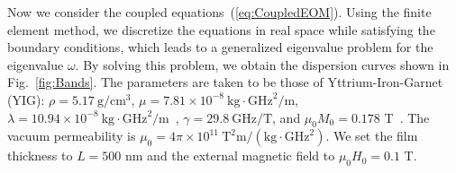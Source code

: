 \documentclass[10pt]{iopart}
\begin{document}
Now we consider the coupled equations~(\ref{eq:CoupledEOM}). Using the finite element method, we discretize the equations in real space while satisfying the boundary conditions, which leads to a generalized eigenvalue problem for the eigenvalue $\omega$. By solving this problem, we obtain the dispersion curves shown in Fig.~\ref{fig:Bands}. The parameters are taken to be those of Yttrium-Iron-Garnet (YIG): $\rho=5.17\ \mathrm{g}/\mathrm{cm}^3$, $\mu=7.81\times10^{-8}\ \mathrm{kg}\cdot\mathrm{GHz}^2/\mathrm{m}$, $\lambda=10.94\times10^{-8}\ \mathrm{kg}\cdot\mathrm{GHz}^2/\mathrm{m}$~\cite{clarkElasticConstantsSingleCrystal1961}, $\gamma=29.8\ \mathrm{GHz}/\mathrm{T}$, and $\mu_0M_0=0.178$ T~\cite{AulockHandbookofferritematerials}. The vacuum permeability is $\mu_0=4\pi\times10^{11}\ \mathrm{T}^2\mathrm{m}/(\mathrm{kg}\cdot\mathrm{GHz}^2)$. We set the film thickness to $L=500$ nm and the external magnetic field to $\mu_0H_0=0.1$ T.
\end{document}
